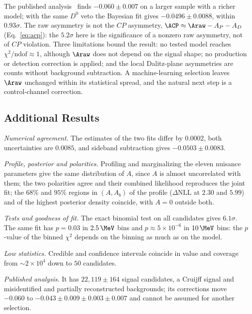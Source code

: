 \label{sec:comparison_published}
The published analysis~\cite{lhcb_cpv_2013} finds $-0.060\pm0.007$ on a larger sample with a richer model; with the same $D^0$ veto the Bayesian fit gives $-0.0496\pm0.0088$, within $0.93\sigma$. The raw asymmetry is not the $CP$ asymmetry, $\ACP\approx\Araw-A_P-A_D$ (Eq.~\eqref{eq:acp}): the $5.2\sigma$ here is the significance of a nonzero raw asymmetry, not of $CP$ violation. Three limitations bound the result: no tested model reaches $\chi^2/\mathrm{ndof}\approx1$, although $\Araw$ does not depend on the signal shape; no production or detection correction is applied; and the local Dalitz-plane asymmetries are counts without background subtraction. A machine-learning selection leaves $\Araw$ unchanged within its statistical spread, and the natural next step is a control-channel correction.

\subsection{Additional Results}
\emph{Numerical agreement.} The estimates of the two fits differ by $0.0002$, both uncertainties are $0.0085$, and sideband subtraction gives $-0.0503\pm0.0083$.

\emph{Profile, posterior and polarities.} Profiling and marginalizing the eleven nuisance parameters give the same distribution of $A$, since $A$ is almost uncorrelated with them; the two polarities agree and their combined likelihood reproduces the joint fit; the $68\%$ and $95\%$ regions in $(A,A_b)$ of the profile ($\Delta\mathrm{NLL}$ at $2.30$ and $5.99$) and of the highest posterior density coincide, with $A=0$ outside both.

\emph{Tests and goodness of fit.} The exact binomial test on all candidates gives $6.1\sigma$. The same fit has $p=0.03$ in $2.5\,\MeV$ bins and $p\approx5\times10^{-6}$ in $10\,\MeV$ bins: the $p$-value of the binned $\chi^2$ depends on the binning as much as on the model.

\emph{Low statistics.} Credible and confidence intervals coincide in value and coverage from $\sim2\times10^4$ down to $50$ candidates.

\emph{Published analysis.} It has $22{,}119\pm164$ signal candidates, a Cruijff signal and misidentified and partially reconstructed backgrounds; its corrections move $-0.060$ to $-0.043\pm0.009\pm0.003\pm0.007$ and cannot be assumed for another selection.

